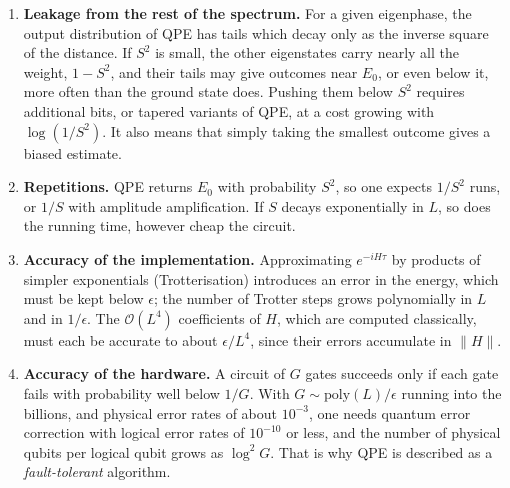 \documentclass[handoutsbeamer.tex]{subfiles}
\begin{document}
\begin{frame}
{\begin{enumerate}
    \item \textbf{Leakage from the rest of the spectrum.} For a given eigenphase, the output distribution of QPE has tails which decay only as the inverse square of the distance. If $S^2$ is small, the other eigenstates carry nearly all the weight, $1-S^2$, and their tails may give outcomes near $E_0$, or even below it, more often than the ground state does. Pushing them below $S^2$ requires additional bits, or tapered variants of QPE, at a cost growing with $\log(1/S^2)$. It also means that simply taking the smallest outcome gives a biased estimate.
    \item \textbf{Repetitions.} QPE returns $E_0$ with probability $S^2$, so one expects $1/S^2$ runs, or $1/S$ with amplitude amplification. If $S$ decays exponentially in $L$, so does the running time, however cheap the circuit.
    \item \textbf{Accuracy of the implementation.} Approximating $e^{-iH\tau}$ by products of simpler exponentials (Trotterisation) introduces an error in the energy, which must be kept below $\epsilon$; the number of Trotter steps grows polynomially in $L$ and in $1/\epsilon$. The $\mathcal O(L^4)$ coefficients of $H$, which are computed classically, must each be accurate to about $\epsilon/L^4$, since their errors accumulate in $\|H\|$.
    \item \textbf{Accuracy of the hardware.} A circuit of $G$ gates succeeds only if each gate fails with probability well below $1/G$. With $G \sim \mathrm{poly}(L)/\epsilon$ running into the billions, and physical error rates of about $10^{-3}$, one needs quantum error correction with logical error rates of $10^{-10}$ or less, and the number of physical qubits per logical qubit grows as $\log^2 G$. That is why QPE is described as a \emph{fault-tolerant} algorithm.
\end{enumerate}}
\end{frame}
\end{document}
